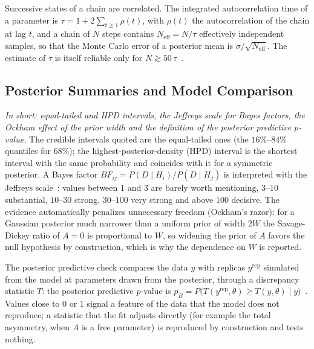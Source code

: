 Successive states of a chain are correlated. The integrated autocorrelation time of a parameter is $\tau=1+2\sum_{t\geq1}\rho(t)$, with $\rho(t)$ the autocorrelation of the chain at lag $t$, and a chain of $N$ steps contains $N_{\mathrm{eff}}=N/\tau$ effectively independent samples, so that the Monte Carlo error of a posterior mean is $\sigma/\sqrt{N_{\mathrm{eff}}}$. The estimate of $\tau$ is itself reliable only for $N\gtrsim50\,\tau$~\cite{emcee}.

\subsection{Posterior Summaries and Model Comparison}
\emph{In short: equal-tailed and HPD intervals, the Jeffreys scale for Bayes factors, the Ockham effect of the prior width and the definition of the posterior predictive $p$-value.}
The credible intervals quoted are the equal-tailed ones (the $16\%$--$84\%$ quantiles for $68\%$); the highest-posterior-density (HPD) interval is the shortest interval with the same probability and coincides with it for a symmetric posterior. A Bayes factor $BF_{ij}=P(D\mid H_i)/P(D\mid H_j)$ is interpreted with the Jeffreys scale~\cite{jeffreys,kass_raftery}: values between $1$ and $3$ are barely worth mentioning, $3$--$10$ substantial, $10$--$30$ strong, $30$--$100$ very strong and above $100$ decisive. The evidence automatically penalizes unnecessary freedom (Ockham's razor): for a Gaussian posterior much narrower than a uniform prior of width $2W$ the Savage-Dickey ratio of $A=0$ is proportional to $W$, so widening the prior of $A$ favors the null hypothesis by construction, which is why the dependence on $W$ is reported.

The posterior predictive check compares the data $y$ with replicas $y^{\mathrm{rep}}$ simulated from the model at parameters drawn from the posterior, through a discrepancy statistic $T$: the posterior predictive $p$-value is $p_B=P\big(T(y^{\mathrm{rep}},\theta)\geq T(y,\theta)\mid y\big)$~\cite{gelman_ppc}. Values close to $0$ or $1$ signal a feature of the data that the model does not reproduce; a statistic that the fit adjusts directly (for example the total asymmetry, when $A$ is a free parameter) is reproduced by construction and tests nothing.

